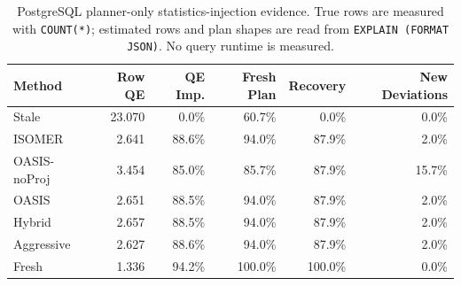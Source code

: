 \begin{table}[t]
  \centering
  \small
  \caption{PostgreSQL planner-only statistics-injection evidence. True rows are measured with \texttt{COUNT(*)}; estimated rows and plan shapes are read from \texttt{EXPLAIN (FORMAT JSON)}. No query runtime is measured.}
  \label{tab:postgres_planner_stats_injection}
  \setlength{\tabcolsep}{4pt}
  \begin{tabular}{lrrrrr}
    \toprule
    Method & Row QE & QE Imp. & Fresh Plan & Recovery & New Deviations \\
    \midrule
    Stale & 23.070 & 0.0\% & 60.7\% & 0.0\% & 0.0\% \\
    ISOMER & 2.641 & 88.6\% & 94.0\% & 87.9\% & 2.0\% \\
    OASIS-noProj & 3.454 & 85.0\% & 85.7\% & 87.9\% & 15.7\% \\
    OASIS & 2.651 & 88.5\% & 94.0\% & 87.9\% & 2.0\% \\
    Hybrid & 2.657 & 88.5\% & 94.0\% & 87.9\% & 2.0\% \\
    Aggressive & 2.627 & 88.6\% & 94.0\% & 87.9\% & 2.0\% \\
    Fresh & 1.336 & 94.2\% & 100.0\% & 100.0\% & 0.0\% \\
    \bottomrule
  \end{tabular}
\end{table}
